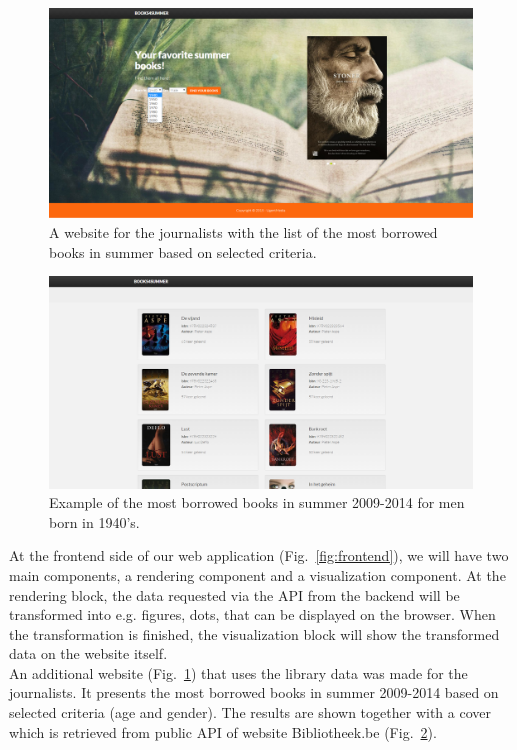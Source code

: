 \begin{figure}[h!]
	\centering
	\includegraphics[width=16cm]{fig/books4summer}
	\caption{A website for the journalists with the list of the most borrowed books in summer based on selected criteria.}
	\label{fig:books4summer}
\end{figure}


\begin{figure}[h!]
	\centering
	\includegraphics[width=16cm]{fig/books4summer-result}
	\caption{Example of the most borrowed books in summer 2009-2014 for men born in 1940's.}
	\label{fig:books4summer-result}
\end{figure}

At the frontend side of our web application (Fig.~\ref{fig:frontend}), we will have two main components, a rendering component and a visualization component. At the rendering block, the data requested via the API from the backend will be transformed into e.g. figures, dots, that can be displayed on the browser. When the transformation is finished, the visualization block will show the transformed data on the website itself.\\
An additional website (Fig.~\ref{fig:books4summer}) that uses the library data was made for the journalists. It presents the most borrowed books in summer 2009-2014 based on selected criteria (age and gender). The results are shown together with a cover which is retrieved from public API of website Bibliotheek.be (Fig.~\ref{fig:books4summer-result}).


